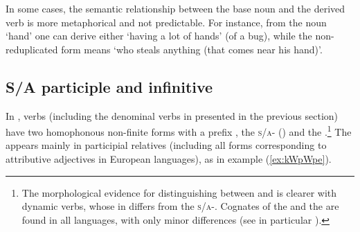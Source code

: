 \documentclass[output=paper]{langsci/langscibook}
\begin{document}
\begin{table} 
\caption{The denominal prefix }\label{tab:aGW}
\end{table}

In some cases, the semantic relationship between the base noun and the derived verb is more metaphorical and not predictable. For instance, from the noun  `hand' one can derive either  `having a lot of hands' (of a bug), while the non-reduplicated form  means `who steals anything (that comes near his hand)'.

\subsection{S/A participle and infinitive}

In ,  verbs (including the denominal verbs in  presented in the previous section) have two homophonous non-finite forms with a prefix , the \textsc{s\slash a}- (\citealt[5]{jacques14antipassive}) and the .\footnote{The morphological evidence for distinguishing between  and  is clearer with dynamic verbs, whose  in  differs from the \textsc{s\slash a}-. Cognates of the  and the   are found in all  languages, with only minor differences (see in particular \citealt{sun14generic}).} The  appears mainly in participial relatives (including all forms corresponding to attributive adjectives in European languages), as in example (\ref{ex:kWpWpe}).
\end{document}
